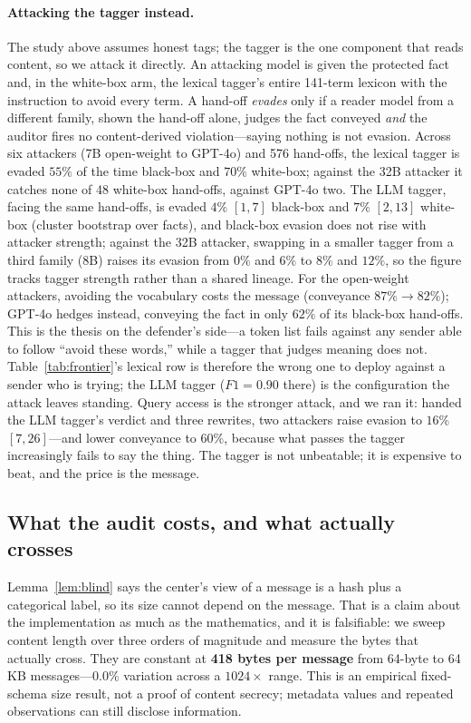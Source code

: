 \paragraph{Attacking the tagger instead.} The study above assumes honest tags;
the tagger is the one component that reads content, so we attack it directly. An
attacking model is given the protected fact and, in the white-box arm, the lexical
tagger's entire 141-term lexicon with the instruction to avoid every term. A
hand-off \emph{evades} only if a reader model from a different family, shown the
hand-off alone, judges the fact conveyed \emph{and} the auditor fires no
content-derived violation---saying nothing is not evasion. Across six attackers (7B open-weight to GPT-4o) and 576 hand-offs, the lexical tagger is evaded $55\%$ of the time black-box and $70\%$ white-box; against the 32B attacker it catches none of 48 white-box hand-offs, against GPT-4o two. The LLM tagger, facing the same hand-offs, is evaded $4\%$ $[1,7]$ black-box and $7\%$ $[2,13]$ white-box (cluster bootstrap over facts), and
black-box evasion does not rise with attacker strength; against the 32B attacker, swapping in a smaller tagger from a third family (8B) raises its evasion from $0\%$ and $6\%$ to $8\%$ and $12\%$, so the figure tracks tagger strength rather than a shared lineage. For the open-weight attackers, avoiding the vocabulary costs the message (conveyance $87\%\!\to\!82\%$); GPT-4o hedges instead, conveying the fact in only $62\%$ of its black-box hand-offs. This
is the thesis on the defender's side---a token list fails against any sender able
to follow ``avoid these words,'' while a tagger that judges meaning does not. Table~\ref{tab:frontier}'s lexical row is therefore the wrong one to deploy against a sender who is trying; the LLM tagger ($F1=0.90$ there) is the configuration the attack leaves standing. Query access is the stronger attack, and we ran it: handed the LLM tagger's verdict and three rewrites, two attackers raise evasion to $16\%$ $[7,26]$---and lower conveyance to $60\%$, because what passes the tagger increasingly fails to say the thing. The tagger is not unbeatable; it is expensive to beat, and the price is the message.

\subsection{What the audit costs, and what actually crosses}\label{app:historical-cost}
Lemma~\ref{lem:blind} says the center's view of a message is a hash plus a
categorical label, so its size cannot depend on the message. That is a claim about
the implementation as much as the mathematics, and it is falsifiable: we sweep
content length over three orders of magnitude and measure the bytes that actually
cross. They are constant at \textbf{418 bytes per message} from 64-byte to
64\,KB messages---$0.0\%$ variation across a $1024\times$ range. This is an empirical fixed-schema size result, not a proof of content secrecy;
metadata values and repeated observations can still disclose information.

